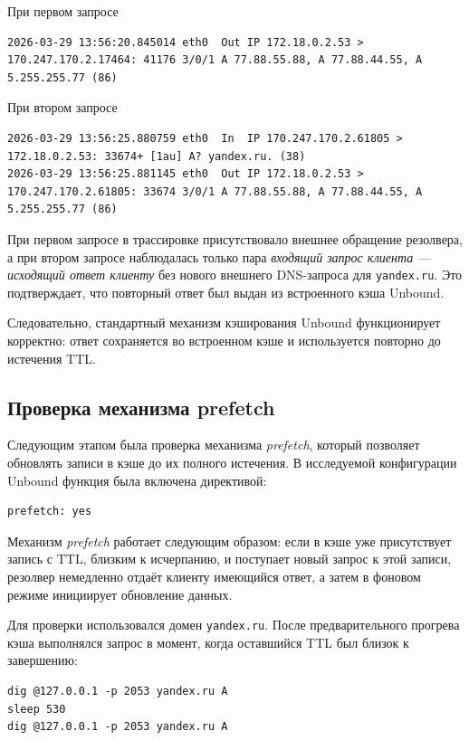 \documentclass[a4paper,14pt]{extarticle}
\begin{document}
При первом запросе 
\begin{lstlisting}
2026-03-29 13:56:20.845014 eth0  Out IP 172.18.0.2.53 > 170.247.170.2.17464: 41176 3/0/1 A 77.88.55.88, A 77.88.44.55, A 5.255.255.77 (86)
\end{lstlisting}

При втором запросе 
\begin{lstlisting}
2026-03-29 13:56:25.880759 eth0  In  IP 170.247.170.2.61805 > 172.18.0.2.53: 33674+ [1au] A? yandex.ru. (38)
2026-03-29 13:56:25.881145 eth0  Out IP 172.18.0.2.53 > 170.247.170.2.61805: 33674 3/0/1 A 77.88.55.88, A 77.88.44.55, A 5.255.255.77 (86)
\end{lstlisting}

При первом запросе в трассировке присутствовало внешнее обращение резолвера, а при втором запросе наблюдалась только пара \textit{входящий запрос клиента --- исходящий ответ клиенту} без нового внешнего DNS-запроса для \texttt{yandex.ru}. Это подтверждает, что повторный ответ был выдан из встроенного кэша Unbound.

Следовательно, стандартный механизм кэширования Unbound функционирует корректно: ответ сохраняется во встроенном кэше и используется повторно до истечения TTL.

\subsection{Проверка механизма prefetch}
Следующим этапом была проверка механизма \textit{prefetch}, который позволяет обновлять записи в кэше до их полного истечения. В исследуемой конфигурации Unbound функция была включена директивой:

\begin{lstlisting}
prefetch: yes
\end{lstlisting}

Механизм \textit{prefetch} работает следующим образом: если в кэше уже присутствует запись с TTL, близким к исчерпанию, и поступает новый запрос к этой записи, резолвер немедленно отдаёт клиенту имеющийся ответ, а затем в фоновом режиме инициирует обновление данных.

Для проверки использовался домен \texttt{yandex.ru}. После предварительного прогрева кэша выполнялся запрос в момент, когда оставшийся TTL был близок к завершению:

\begin{lstlisting}
dig @127.0.0.1 -p 2053 yandex.ru A
sleep 530
dig @127.0.0.1 -p 2053 yandex.ru A
\end{lstlisting}
\end{document}

